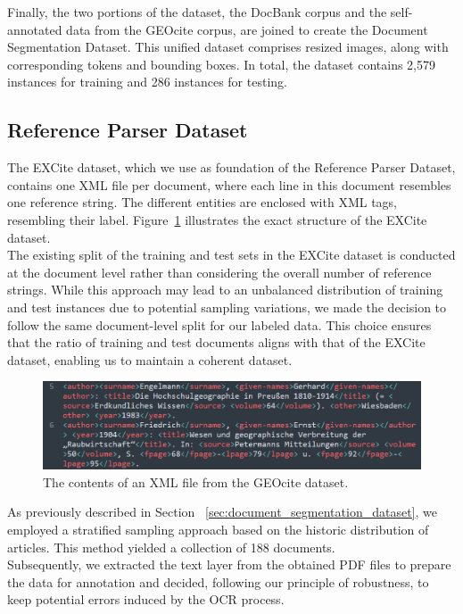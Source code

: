 Finally, the two portions of the dataset, the DocBank corpus and the self-annotated data from the GEOcite corpus, are joined to create the Document Segmentation Dataset. This unified dataset comprises resized images, along with corresponding tokens and bounding boxes. In total, the dataset contains 2,579 instances for training and 286 instances for testing.

\subsection{Reference Parser Dataset}
The EXCite dataset, which we use as foundation of the Reference Parser Dataset, contains one XML file per document, where each line in this document resembles one reference string. The different entities are enclosed with XML tags, resembling their label. Figure~\ref{fig:reference_xml} illustrates the exact structure of the EXCite dataset.\\
The existing split of the training and test sets in the EXCite dataset is conducted at the document level rather than considering the overall number of reference strings. While this approach may lead to an unbalanced distribution of training and test instances due to potential sampling variations, we made the decision to follow the same document-level split for our labeled data. This choice ensures that the ratio of training and test documents aligns with that of the EXCite dataset, enabling us to maintain a coherent dataset.

\begin{figure}[!ht]
    \centering
    \includegraphics[width=0.95\linewidth]{images/example_reference_xml.png}
    \caption{The contents of an XML file from the GEOcite dataset.}
    \label{fig:reference_xml}
\end{figure}

As previously described in Section ~\ref{sec:document_segmentation_dataset}, we employed a stratified sampling approach based on the historic distribution of articles. This method yielded a collection of 188 documents.\\
Subsequently, we extracted the text layer from the obtained PDF files to prepare the data for annotation and decided, following our principle of robustness, to keep potential errors induced by the OCR process.\\

